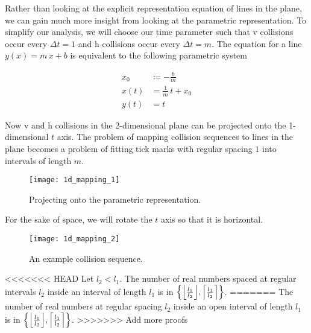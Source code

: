 
Rather than looking at the explicit representation equation of lines in the plane, we can gain much more insight from looking at the parametric representation. To simplify our analysis, we will choose our time parameter such that v collisions occur every $\Delta t = 1$ and h collisions occur every $\Delta t = m$. The equation for a line $y(x) = m \, x + b$ is equivalent to the following parametric system

\begin{align}\label{eq:parametric-line}
	x_0& \coloneqq - \frac{b}{m}\\
	x(t)& = \frac{1}{m} \, t + x_0\\
	y(t)& = t
\end{align}

Now v and h collisions in the 2-dimensional plane can be projected onto the 1-dimensional $t$ axis. The problem of mapping collision sequences to lines in the plane becomes a problem of fitting tick marks with regular spacing $1$ into intervals of length $m$.

\begin{figure}[H]
  \begin{center}
    \texttt{[image: 1d\_mapping\_1]}
  \end{center}
  \vspace{-.2in} %
  \caption{\label{fig:1d-projection} Projecting onto the parametric representation.}
\end{figure}

For the sake of space, we will rotate the $t$ axis so that it is horizontal.

\begin{figure}[H]
  \begin{center}
    \texttt{[image: 1d\_mapping\_2]}
  \end{center}
  \vspace{-.2in} %
  \caption{\label{fig:1d-problem} An example collision sequence.}
\end{figure}


\begin{lemma}\label{lem:interval-ticks}
<<<<<<< HEAD
	Let $l_2 < l_1$. The number of real numbers spaced at regular intervals $l_2$ inside an interval of length $l_1$ is in $\cbracket{\floor{\frac{l_1}{l_2}}, \ceil{\frac{l_1}{l_2}}}$.
=======
	The number of real numbers at regular spacing $l_2$ inside an open interval of length $l_1$ is in $\cbracket{\floor{\frac{l_1}{l_2}}, \ceil{\frac{l_1}{l_2}}}$.
>>>>>>> Add more proofs
\end{lemma}


